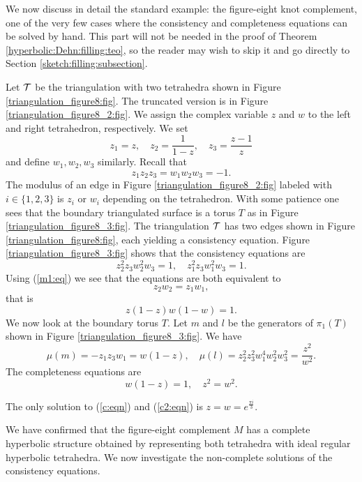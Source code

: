 We now discuss in detail the standard example: the figure-eight knot complement, one of the very few cases where the consistency and completeness equations can be solved by hand. This part will not be needed in the proof of Theorem \ref{hyperbolic:Dehn:filling:teo}, so the reader may wish to skip it and go directly to Section \ref{sketch:filling:subsection}.

Let $\mathcal{T}$ be the triangulation with two tetrahedra shown in Figure \ref{triangulation_figure8:fig}. The truncated version is in Figure \ref{triangulation_figure8_2:fig}. We assign the complex variable $z$ and $w$ to the left and right tetrahedron, respectively. We set
$$z_1 = z, \quad z_2 = \frac{1}{1-z}, \quad z_3 = \frac {z-1}{z}$$
and define $w_1,w_2,w_3$ similarly. Recall that
\begin{equation} \label{m1:eq}
z_1z_2z_3 = w_1w_2w_3 = -1.
\end{equation}
The modulus of an edge in Figure \ref{triangulation_figure8_2:fig} labeled with $i\in \{1,2,3\}$ is $z_i$ or $w_i$ depending on the tetrahedron. With some patience one sees that the boundary triangulated surface is a torus $T$ as in Figure \ref{triangulation_figure8_3:fig}. The triangulation $\mathcal{T}$ has two edges shown in Figure \ref{triangulation_figure8:fig}, each yielding a consistency equation. Figure \ref{triangulation_figure8_3:fig} shows that the consistency equations are
$$z_2^2z_3w_2^2w_3 = 1, \quad z_1^2z_3w_1^2w_3=1.$$
Using (\ref{m1:eq}) we see that the equations are both equivalent to 
$$z_2w_2 = z_1w_1,$$ 
that is
\begin{equation} \label{c:eqn}
z(1-z)w(1-w) = 1.
\end{equation}
We now look at the boundary torus $T$. Let $m$ and $l$ be the generators of $\pi_1(T)$ shown in Figure \ref{triangulation_figure8_3:fig}. We have
\begin{equation} \label{ml:eqn}
\mu(m) = - z_1z_3w_1 = w(1-z), \quad \mu(l) = z_2^2z_3^2w_1^4w_2^2w_3^2 = \frac{z^2}{w^2}.
\end{equation}
The completeness equations are
\begin{equation} \label{c2:eqn}
w(1-z) = 1,\quad z^2 = w^2.
\end{equation}

\begin{ex}
The only solution to (\ref{c:eqn}) and (\ref{c2:eqn}) is $z=w= e^{\frac{\pi i}3}$.
\end{ex}

We have confirmed that the figure-eight complement $M$ has a complete hyperbolic structure obtained by representing both tetrahedra with ideal regular hyperbolic tetrahedra. We now investigate the non-complete solutions of the consistency equations.

